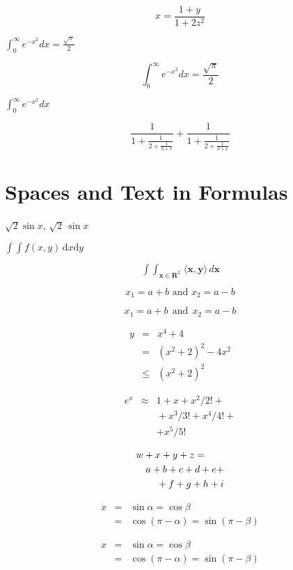 \documentclass{article}
\begin{document}
$$x=\frac{1+y}{1+2z^2}$$

$\int_0^\infty e^{-x^2} dx=\frac{\sqrt{\pi}}{2}$

$$\int_0^\infty e^{-x^2} dx=\frac{\sqrt{\pi}}{2}$$

$\displaystyle \int_0^\infty e^{-x^2} dx$

$$
 \frac{1}{\displaystyle 1+
   \frac{1}{\displaystyle 2+
   \frac{1}{\displaystyle 3+x}}} +
 \frac{1}{1+\frac{1}{2+\frac{1}{3+x}}}
$$

\section{Spaces and Text in Formulas}

$\sqrt{2} \sin x$, $\sqrt{2}\,\sin x$

$\int \!\! \int f(x,y)\,\mathrm{d}x\mathrm{d}y$

$$
 \mathop{\int \!\!\! \int}_{\mathbf{x} \in \mathbf{R}^2} 
 \! \langle \mathbf{x},\mathbf{y}\rangle 
 \,d\mathbf{x}
$$

$$ x_1 = a+b \mbox{ and } x_2=a-b $$

$$ x_1 = a+b ~~\mbox{and}~~ x_2=a-b $$

\begin{eqnarray}
 y &=& x^4 + 4      \nonumber \\
   &=& (x^2+2)^2 -4x^2 \nonumber \\
   &\le&(x^2+2)^2
\end{eqnarray}

\begin{eqnarray*}
 e^x &\approx& 1+x+x^2/2! + \\
   && {}+x^3/3! + x^4/4! + \\
   && + x^5/5!
\end{eqnarray*}

\begin{eqnarray*}
 \lefteqn{w+x+y+z = }\\
   && a+b+c+d+e+\\
   && {}+f+g+h+i
\end{eqnarray*}

\begin{eqnarray*}
 x&=&\sin \alpha = \cos \beta\\
  &=&\cos(\pi-\alpha) = \sin(\pi-\beta)
\end{eqnarray*}

{\setlength\arraycolsep{0.1em}
 \begin{eqnarray*}
  x&=&\sin \alpha = \cos \beta\\
   &=&\cos(\pi-\alpha) = \sin(\pi-\beta)
 \end{eqnarray*}
}
\end{document}
